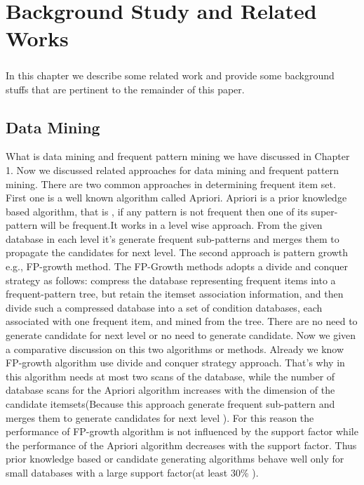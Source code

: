 \documentclass[a4paper,12pt]{book}
\begin{document}
\newpage

\chapter{Background Study and Related Works}
\paragraph{}
In this chapter we describe some related work and provide some background stuffs that are  pertinent to the remainder of this paper.
\section{Data Mining}
What is data mining and frequent pattern mining we have discussed in Chapter 1. Now we discussed related approaches for data mining and frequent pattern mining. There are two common approaches in determining frequent item set. First one is a well known algorithm called Apriori. Apriori is a prior knowledge based  algorithm, that is , if any pattern is not frequent then one of its super-pattern will be frequent.It works in a level wise approach. From the given database in each level it's generate frequent sub-patterns and merges them to propagate the candidates for next level. The second approach is pattern growth e.g., FP-growth method. The FP-Growth methods adopts a divide and conquer strategy as follows: compress the database representing frequent items into a frequent-pattern tree, but retain the itemset association information, and then divide such a compressed database into a set of condition databases, each associated with one frequent item, and mined from the tree. There are no need to generate candidate for next level or no need to generate candidate. Now we given a comparative discussion on this two algorithms or methods. Already we know FP-growth algorithm use divide and conquer strategy approach. That's why in this algorithm needs at most two scans of the database, while the number of database scans for the Apriori algorithm increases with the dimension of the candidate itemsets(Because this approach generate frequent sub-pattern and merges them to generate candidates for next level ). For this reason the performance of FP-growth algorithm is not influenced by the support factor while the performance of the Apriori algorithm decreases with the support factor. Thus prior knowledge based or candidate generating algorithms behave well only for small databases with a large support factor(at least 30\% ).
\end{document}
